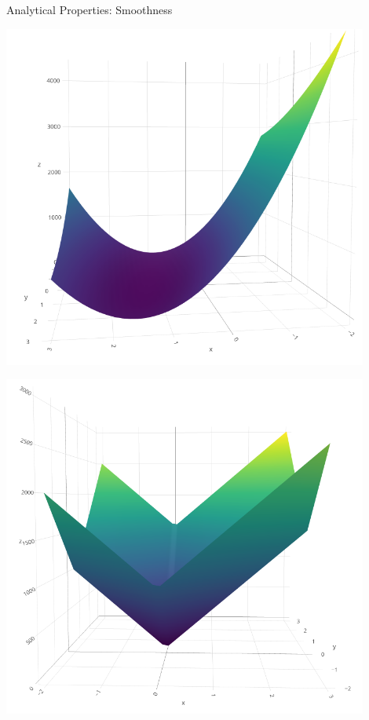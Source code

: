 \begin{vbframe}{Analytical Properties: Smoothness}
\vfill

\begin{minipage}[c]{0.3\textwidth}
  \includegraphics[width=0.9\textwidth]{figure/lasso_unpenalized}
\end{minipage}%
\begin{minipage}[c]{0.05\textwidth}
  \phantom{foo}
\end{minipage}%
\begin{minipage}[c]{0.3\textwidth}
  \includegraphics[width=0.9\textwidth]{figure/lasso_penalty}

\end{minipage}
\end{vbframe}
